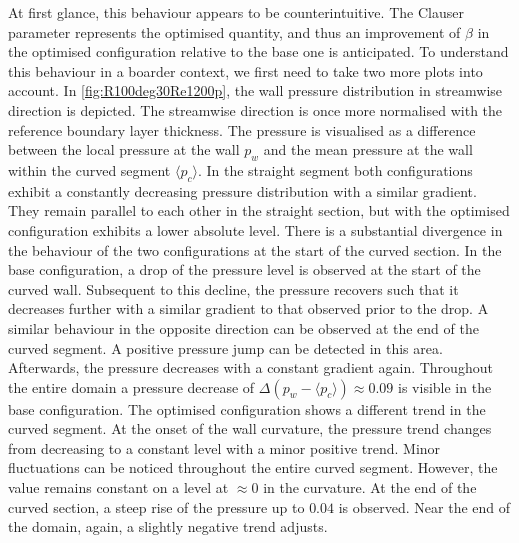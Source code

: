 At first glance, this behaviour appears to be counterintuitive. The Clauser parameter represents the optimised quantity, and thus an improvement of $\beta$ in the optimised configuration relative to the base one is anticipated.
To understand this behaviour in a boarder context, we first need to take two more plots into account.
In \autoref{fig:R100deg30Re1200p}, the wall pressure distribution in streamwise direction is depicted.
The streamwise direction is once more normalised with the reference boundary layer thickness. 
The pressure is visualised as a difference between the local pressure at the wall $p_w$ and the mean pressure at the wall within the curved segment $\langle p_c \rangle$.
In the straight segment both configurations exhibit a constantly decreasing pressure distribution with a similar gradient.
They remain parallel to each other in the straight section, but with the optimised configuration exhibits a lower absolute level.
There is a substantial divergence in the behaviour of the two configurations at the start of the curved section.
In the base configuration, a drop of the pressure level is observed at the start of the curved wall. 
Subsequent to this decline, the pressure recovers such that it decreases further with a similar gradient to that observed prior to the drop. 
A similar behaviour in the opposite direction can be observed at the end of the curved segment.
A positive pressure jump can be detected in this area.
Afterwards, the pressure decreases with a constant gradient again.
Throughout the entire domain a pressure decrease of $\Delta(p_w-\langle p_c \rangle) \approx 0.09$ is visible in the base configuration.
The optimised configuration shows a different trend in the curved segment.
At the onset of the wall curvature, the pressure trend changes from decreasing to a constant level with a minor positive trend.
Minor fluctuations can be noticed throughout the entire curved segment.
However, the value remains constant on a  level at $\approx 0$ in the curvature. 
At the end of the curved section, a steep rise of the pressure up to $0.04$ is observed.
Near the end of the domain, again, a slightly negative trend adjusts.


